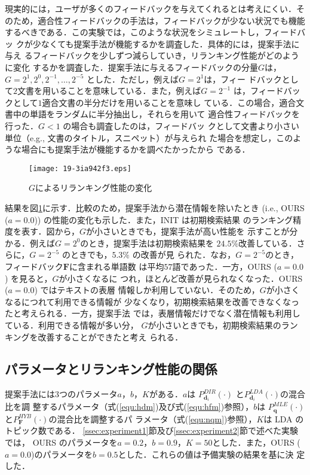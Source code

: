 \documentclass[japanese]{jnlp_1.4}
\begin{document}
現実的には，ユーザが多くのフィードバックを与えてくれるとは考えにくい．そ
のため，適合性フィードバックの手法は，フィードバックが少ない状況でも機能
するべきである．この実験では，このような状況をシミュレートし，フィードバッ
クが少なくても提案手法が機能するかを調査した．具体的には，提案手法に与え
るフィードバックを少しずつ減らしていき，リランキング性能がどのように変化
するかを調査した．提案手法に与えるフィードバックの分量$G$は，$G = 2^{1},
2^{0}, 2^{-1}, \dots, 2^{-5}$ とした．ただし，例えば$G = 2^{1}$は，フィー
ドバックとして$2$文書を用いることを意味している．また，例えば$G =
2^{-1}$ は，フィードバックとして$1$適合文書の半分だけを用いることを意味し
ている．この場合，適合文書中の単語をランダムに半分抽出し，それらを用いて
適合性フィードバックを行った．$G < 1$ の場合も調査したのは，フィードバッ
クとして文書より小さい単位（e.g., 文書のタイトル，スニペット）が与えられ
た場合を想定し，このような場合にも提案手法が機能するかを調べたかったから
である．

\begin{figure}[t]
 \begin{center}
  \texttt{[image: 19-3ia942f3.eps]}
 \end{center}
  \caption{$G$によるリランキング性能の変化}
  \label{fig:F}
\end{figure}


結果を図\ref{fig:F}に示す．比較のため，提案手法から潜在情報を除いたとき
(i.e., OURS ($a = 0.0$)) の性能の変化も示した．また，INIT は初期検索結果
のランキング精度を表す．図から，$G$が小さいときでも，提案手法が高い性能を
示すことが分かる．例えば$G = 2^{0}$のとき，提案手法は初期検索結果を
$24.5\%$改善している．さらに，$G = 2^{-5}$ のときでも，$5.3\%$ の改善が見
られた．なお，$G = 2^{-5}$のとき，フィードバック$\bm{F}$に含まれる単語数
は平均$57$語であった．一方，OURS ($a = 0.0$) を見ると，$G$が小さくなるに
つれ，ほとんど改善が見られなくなった．OURS ($a = 0.0$) ではテキストの表層
情報しか利用していない．そのため，$G$が小さくなるにつれて利用できる情報が
少なくなり，初期検索結果を改善できなくなったと考えられる．一方，提案手法
では，表層情報だけでなく潜在情報も利用している．利用できる情報が多い分，
$G$が小さいときでも，初期検索結果のランキングを改善することができたと考え
られる．



\subsection{パラメータとリランキング性能の関係} \label{ssec:experiment0}

提案手法には$3$つのパラメータ$a$，$b$，$K$がある．$a$は
$P^{DIR}_{\bm{d}_{i}}(\cdot)$ と$P^{LDA}_{\bm{d}_{i}}(\cdot)$の混合比を調
整するパラメータ（式(\ref{equ:hdm})及び式(\ref{equ:hfm})参照），$b$は
$P^{MLE}_{\bm{q}}(\cdot)$と$P^{HYB}_{\bm{F}}(\cdot)$の混合比を調整するパ
ラメータ（式(\ref{equ:nqm})参照），$K$は LDA のトピック数である．
\ref{ssec:experiment1}節及び\ref{ssec:experiment2}節で述べた実験では，
OURS のパラメータを$a = 0.2$，$b = 0.9$，$K = 50$とした．また，OURS ($a
= 0.0$)のパラメータを$b = 0.5$とした．これらの値は予備実験の結果を基に決
定した．
\end{document}
